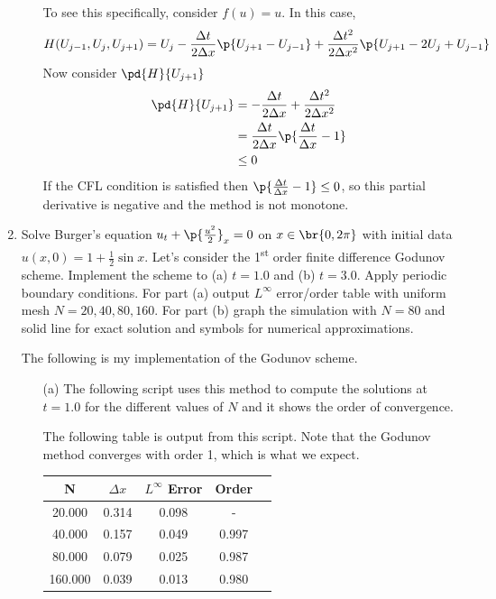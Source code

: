 \documentclass[11pt, oneside]{article}
\begin{document}
\begin{enumerate}
\begin{itemize}
        To see this specifically, consider $f(u) = u$.
        In this case,
        \[
          H(U_{j-1}, U_j, U_{j+1}) = U_j - \frac{\Delta t}{2\Delta x} \p{U_{j+1} - U_{j-1}}
          + \frac{\Delta t^2}{2 \Delta x^2} \p{U_{j+1} - 2U_j + U_{j-1}}
        \]
        Now consider $\pd{H}{U_{j+1}}$
        \begin{align*}
          \pd{H}{U_{j+1}} &= -\frac{\Delta t}{2\Delta x} + \frac{\Delta t^2}{2 \Delta x^2} \\
          &= \frac{\Delta t}{2\Delta x}\p{\frac{\Delta t}{\Delta x} - 1} \\
          &\le 0 \\
        \end{align*}
        If the CFL condition is satisfied then
        $\p{\frac{\Delta t}{\Delta x} - 1} \le 0$, so this partial
        derivative is negative and the method is not monotone.
    \end{itemize}

  \item %
    Solve Burger's equation $u_t + \p{\frac{u^2}{2}}_x = 0$ on
    $x \in \br{0, 2\pi}$ with initial data $u(x, 0) = 1 + \frac{1}{2} \sin{x}$.
    Let's consider the 1\textsuperscript{st} order finite difference Godunov scheme.
    Implement the scheme to (a) $t = 1.0$ and (b) $t = 3.0$.
    Apply periodic boundary conditions.
    For part (a) output $L^{\infty}$ error/order table with uniform mesh
    $N = 20, 40, 80, 160$.
    For part (b) graph the simulation with $N = 80$ and solid line for exact
    solution and symbols for numerical approximations.

    The following is my implementation of the Godunov scheme.
    
    \begin{enumerate}
      \item[(a)] %
        The following script uses this method to compute the solutions at
        $t = 1.0$ for the different values of $N$ and it shows the order of
        convergence.
        
        The following table is output from this script.
        Note that the Godunov method converges with order 1, which is what we
        expect.
        \begin{center}
          \begin{tabular}{*{5}{c}}
            \toprule
            N & $\Delta x$ & $L^{\infty}$ Error & Order \\
            \midrule
            20.000 & 0.314 & 0.098 & - \\
            40.000 & 0.157 & 0.049 & 0.997 \\
            80.000 & 0.079 & 0.025 & 0.987 \\
            160.000 & 0.039 & 0.013 & 0.980 \\
            \bottomrule
          \end{tabular}
        \end{center}


\end{enumerate}
\end{enumerate}
\end{document}
